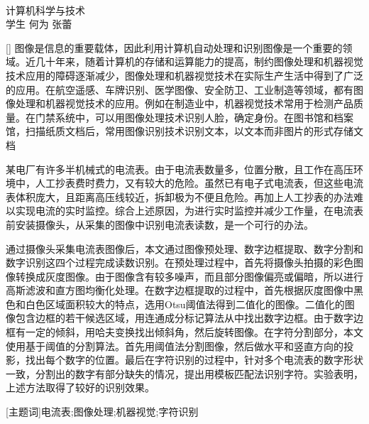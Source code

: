 \begin{center}
\vspace*{18pt}
{\heiti{}\thesistitle}\\[18pt]
\quad 计算机科学与技术\\[12pt]
{\kaishu 学生} \quad 何为  \quad 张蕾\\[24pt]
\end{center}\par

[{}]
图像是信息的重要载体，因此利用计算机自动处理和识别图像是一个重要的领域。近几十年来，随着计算机的存储和运算能力的提高，制约图像处理和机器视觉技术应用的障碍逐渐减少，图像处理和机器视觉技术在实际生产生活中得到了广泛的应用。在航空遥感、车牌识别、医学图像、安全防卫、工业制造等领域，都有图像处理和机器视觉技术的应用。例如在制造业中，机器视觉技术常用于检测产品质量。在门禁系统中，可以用图像处理技术识别人脸，确定身份。在图书馆和档案馆，扫描纸质文档后，常用图像识别技术识别文本，以文本而非图片的形式存储文档

某电厂有许多半机械式的电流表。由于电流表数量多，位置分散，且工作在高压环境中，人工抄表费时费力，又有较大的危险。虽然已有电子式电流表，但这些电流表体积庞大，且距离高压线较近，拆卸极为不便且危险。再加上人工抄表的办法难以实现电流的实时监控。综合上述原因，为进行实时监控并减少工作量，在电流表前安装摄像头，从采集的图像中识别电流表读数，是一个可行的办法。

通过摄像头采集电流表图像后，本文通过图像预处理、数字边框提取、数字分割和数字识别这四个过程完成读数识别。在预处理过程中，首先将摄像头拍摄的彩色图像转换成灰度图像。由于图像含有较多噪声，而且部分图像偏亮或偏暗，所以进行高斯滤波和直方图均衡化处理。在数字边框提取的过程中，首先根据灰度图像中黑色和白色区域面积较大的特点，选用Otsu阈值法得到二值化的图像。二值化的图像包含边框的若干候选区域，用连通成分标记算法从中找出数字边框。由于数字边框有一定的倾斜，用哈夫变换找出倾斜角，然后旋转图像。在字符分割部分，本文使用基于阈值的分割算法。首先用阈值法分割图像，然后做水平和竖直方向的投影，找出每个数字的位置。最后在字符识别的过程中，针对多个电流表的数字形状一致，分割出的数字有部分缺失的情况，提出用模板匹配法识别字符。实验表明，上述方法取得了较好的识别效果。

\vspace{10pt}

[{\heiti 主题词}]{\kaishu 电流表;\quad 图像处理;\quad 机器视觉;\quad 字符识别}

